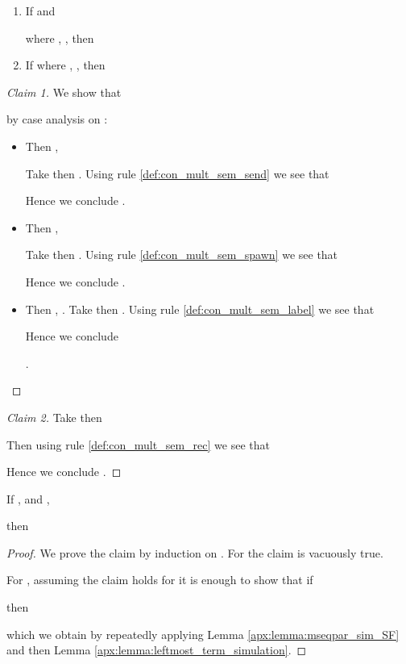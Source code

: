 \begin{lemma}\label{apx:lemma:leftmost_term_simulation}
\begin{enumerate}
	\item If  and
			  
			where 
				  , 
				  , 
			then 
			
	\item If 
			where 
				  , 
				  , 
			then 
			
\end{enumerate}
\end{lemma}
\begin{proof}[Claim 1]
We show that 

by case analysis on :
\begin{itemize}
\item  \newline
	Then , 

	Take  then 
	. 
	Using rule \ref{def:con_mult_sem_send} we see that 
	
	
	Hence we conclude 
	.
	\item  \newline
	Then , 
	     

	Take  then
	.
	Using rule \ref{def:con_mult_sem_spawn} we see that 
	 
	
	Hence we conclude 
	.
	\item  \newline
	Then , 
	     .
	Take  then
	. 
	Using rule \ref{def:con_mult_sem_label} we see that 
	 
	Hence we conclude 

	.
\end{itemize}
\end{proof}
\begin{proof}[Claim 2]
	Take 
	then 

	Then using rule \ref{def:con_mult_sem_rec} we see that 
	 
	
	Hence we conclude 
	.
\end{proof}
\pagebreak
\begin{lemma}\label{apx:lemma:leftmost_term_simulation_with_comsideeffects}
	\item If ,  and , 
			  
			then 
			
\end{lemma}
\begin{proof}
We prove the claim by induction on .
For  the claim is vacuously true.

For , assuming the claim holds for  it is enough to show that if

then 

which we obtain by repeatedly applying Lemma \ref{apx:lemma:mseqpar_sim_SF} and then Lemma \ref{apx:lemma:leftmost_term_simulation}.
\end{proof}

